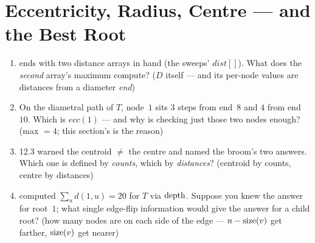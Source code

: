 \section{Eccentricity, Radius, Centre --- and the Best Root}\label{sec:c09-radius}

\begin{previouslybox}
\begin{enumerate}[nosep, leftmargin=1.6em]
  \item {} ends with two distance arrays in hand (the sweeps'
        $\mathit{dist}[]$). What does the \emph{second} array's maximum compute? ($D$
        itself --- and its per-node values are distances from a diameter \emph{end})
  \item On the diametral path of $T$, node~$1$ sits $3$ steps from end~$8$ and $4$ from
        end~$10$. Which is $\mathit{ecc}(1)$ --- and why is checking just those two
        nodes enough? (max $=4$; this section's  is the reason)
  \item 12.3 warned the centroid $\ne$ the centre and named the broom's two answers.
        Which one is defined by \emph{counts}, which by \emph{distances}? (centroid by
        counts, centre by distances)
  \item {} computed $\sum_u d(1,u) = 20$ for $T$ via $\operatorname{depth}$. Suppose
        you knew the answer for root~$1$; what single edge-flip information would give
        the answer for a child root? (how many nodes are on each side of the edge ---
        $n - \operatorname{size}(v)$ get farther, $\operatorname{size}(v)$ get nearer)
\end{enumerate}
\end{previouslybox}

